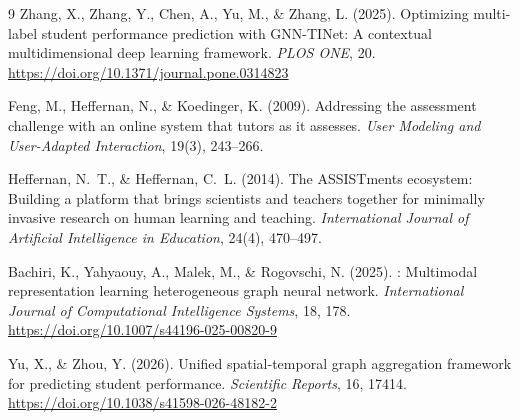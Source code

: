 \documentclass[sigconf,review]{acmart}
\begin{document}
\begin{thebibliography}{9}
Zhang, X., Zhang, Y., Chen, A., Yu, M., \& Zhang, L. (2025).
\newblock Optimizing multi-label student performance prediction with
  {GNN-TINet}: A contextual multidimensional deep learning framework.
\newblock \emph{PLOS ONE}, 20.
\newblock \url{https://doi.org/10.1371/journal.pone.0314823}

Feng, M., Heffernan, N., \& Koedinger, K. (2009).
\newblock Addressing the assessment challenge with an online system that tutors
  as it assesses.
\newblock \emph{User Modeling and User-Adapted Interaction}, 19(3), 243--266.

Heffernan, N.~T., \& Heffernan, C.~L. (2014).
\newblock The {ASSISTments} ecosystem: Building a platform that brings
  scientists and teachers together for minimally invasive research on human
  learning and teaching.
\newblock \emph{International Journal of Artificial Intelligence in Education},
  24(4), 470--497.

Bachiri, K., Yahyaouy, A., Malek, M., \& Rogovschi, N.
  (2025).
: Multimodal representation learning
  heterogeneous graph neural network.
\newblock \emph{International Journal of Computational
  Intelligence Systems}, 18, 178.
\newblock \url{https://doi.org/10.1007/s44196-025-00820-9}

Yu, X., \& Zhou, Y. (2026).
\newblock Unified spatial-temporal graph aggregation
  framework for predicting student performance.
\newblock \emph{Scientific Reports}, 16, 17414.
\newblock \url{https://doi.org/10.1038/s41598-026-48182-2}

\end{thebibliography}
\end{document}
